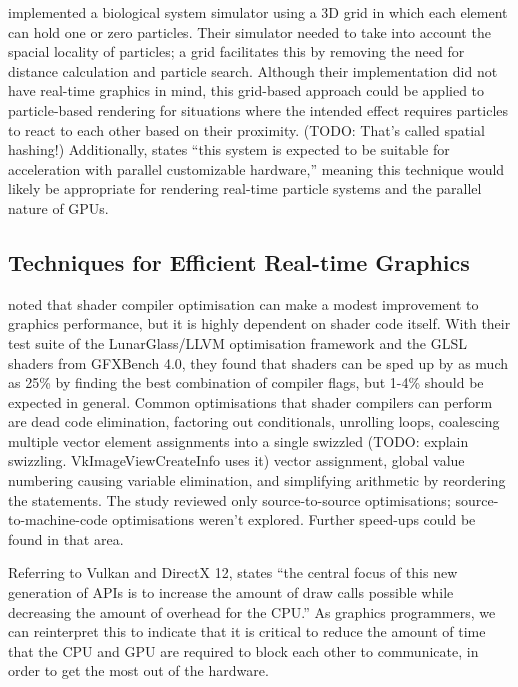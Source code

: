 \documentclass[11pt, a4paper, twocolumn]{article}
\begin{document}
\citet{Boulianne2007} implemented a biological system simulator using a 3D grid in which each element can hold one or zero particles. Their simulator needed to take into account the spacial locality of particles; a grid facilitates this by removing the need for distance calculation and particle search. Although their implementation did not have real-time graphics in mind, this grid-based approach could be applied to particle-based rendering for situations where the intended effect requires particles to react to each other based on their proximity. (TODO: That's called spatial hashing!) Additionally, \citet{Boulianne2007} states ``this system is expected to be suitable for acceleration with parallel customizable hardware,'' meaning this technique would likely be appropriate for rendering real-time particle systems and the parallel nature of GPUs.

\subsection{Techniques for Efficient Real-time Graphics}

\citet{Crawford2018} noted that shader compiler optimisation can make a modest improvement to graphics performance, but it is highly dependent on shader code itself. With their test suite of the LunarGlass/LLVM optimisation framework and the GLSL shaders from GFXBench 4.0, they found that shaders can be sped up by as much as 25\% by finding the best combination of compiler flags, but 1-4\% should be expected in general. Common optimisations that shader compilers can perform are dead code elimination, factoring out conditionals, unrolling loops, coalescing multiple vector element assignments into a single swizzled (TODO: explain swizzling. VkImageViewCreateInfo uses it) vector assignment, global value numbering causing variable elimination, and simplifying arithmetic by reordering the statements. The study reviewed only source-to-source optimisations; source-to-machine-code optimisations weren't explored. Further speed-ups could be found in that area.

Referring to Vulkan and DirectX 12, \citet{Joseph2016} states ``the central focus of this new generation of APIs is to increase the amount of draw calls possible while decreasing the amount of overhead for the CPU.'' As graphics programmers, we can reinterpret this to indicate that it is critical to reduce the amount of time that the CPU and GPU are required to block each other to communicate, in order to get the most out of the hardware.
\end{document}
